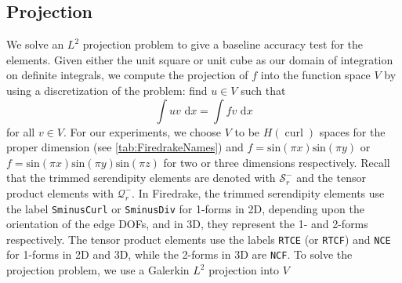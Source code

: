 \documentclass[format=acmsmall,screen,timestamp=false,a4paper]{acmart}
\DeclareMathOperator{\curl}{curl}
\newcommand\akg[1]{\textbf{\textcolor[rgb]{.5,0,1}{[Andrew: #1]}}}
\newcommand\josh[1]{\textbf{\textcolor[rgb]{0,.5,1}{[Josh: #1]}}}
\newcommand{\hcurl}{\ensuremath{{H}(\curl)}\xspace}
\begin{document}








\subsection{Projection}
  
We solve an $L^2$ projection problem to give a baseline accuracy test for the elements. Given either the unit square or unit cube as our domain of integration on definite integrals, we compute the projection of $f$ into the function space $V$ by using a discretization of the problem: find $u\in V$ such that
\begin{equation*}
  \int u v  \text{ d}x = \int f v \text{ d}x
\end{equation*}
for all $v \in V$.  For our experiments, we choose $V$ to be \hcurl spaces for the proper dimension (see \cref{tab:FiredrakeNames}) and $f = \text{sin}(\pi x)\text{sin}(\pi y)$ or $f=\text{sin}(\pi x)\text{sin}(\pi y)\text{sin}(\pi z)$ for two or three dimensions respectively.
Recall that the trimmed serendipity elements are denoted with $\mathcal{S}_r^-$ and the tensor product elements with $\mathcal{Q}^-_r$.  In Firedrake, the trimmed serendipity elements use the label \texttt{SminusCurl} or \texttt{SminusDiv} for 1-forms in 2D, depending upon the orientation of the edge DOFs, and in 3D, they represent the 1- and 2-forms respectively.  The tensor product elements use the labels \texttt{RTCE} (or \texttt{RTCF}) and  \texttt{NCE} for 1-forms in 2D and 3D, while the 2-forms in 3D are  \texttt{NCF}.  To solve the projection problem, we use a Galerkin $L^2$ projection into $V$
\end{document}
